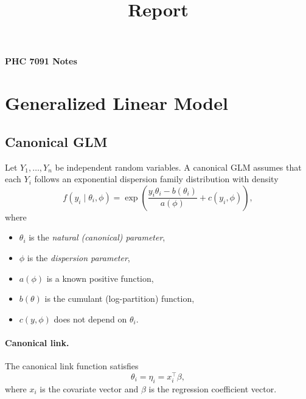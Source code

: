 \documentclass[11pt]{article}
\theoremstyle{definition}
\begin{document}
\title{Report}

\thispagestyle{empty}

\begin{center}
{\LARGE \bf PHC 7091 Notes}\\
\end{center}
\tableofcontents
\newpage
\section{Generalized Linear Model}
\subsection{Canonical GLM}

Let $Y_1,\dots,Y_n$ be independent random variables. A canonical GLM assumes that
each $Y_i$ follows an exponential dispersion family distribution with density
\[
f(y_i \mid \theta_i, \phi)
=
\exp\!\left(
\frac{y_i \theta_i - b(\theta_i)}{a(\phi)}
+ c(y_i,\phi)
\right),
\]
where
\begin{itemize}
  \item $\theta_i$ is the \emph{natural (canonical) parameter},
  \item $\phi$ is the \emph{dispersion parameter},
  \item $a(\phi)$ is a known positive function,
  \item $b(\theta)$ is the cumulant (log-partition) function,
  \item $c(y,\phi)$ does not depend on $\theta_i$.
\end{itemize}
\paragraph{Canonical link.}
The canonical link function satisfies
\[
\theta_i = \eta_i = x_i^\top \beta,
\]
where $x_i$ is the covariate vector and $\beta$ is the regression coefficient vector.
\end{document}
